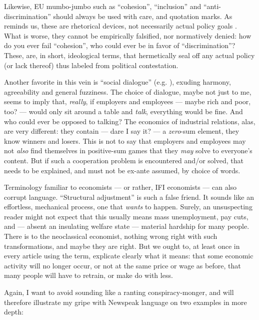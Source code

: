 \documentclass[11pt,a4paper,oneside,openright]{article}
\begin{document}
Likewise, \gls{EU} mumbo-jumbo such as ``cohesion'', ``inclusion'' and ``anti-discrimination'' should always be used with care, and quotation marks. 
As \citeauthor{Offe2003} reminds us, these are rhetorical devices, not necessarily actual policy goals \citeyearpar[461]{Offe2003}. 
What is worse, they cannot be empirically falsified, nor normatively denied: 
how do you ever fail ``cohesion'', who could ever be in favor of ``discrimination''? 
These, are, in short, ideological terms, that hermetically seal off any actual policy (or lack thereof) thus labeled from political contestation.

Another favorite in this vein is ``social dialogue'' (e.g. \citealt{Durr2009}), exuding harmony, agreeability and general fuzziness. 
The choice of dialogue, maybe not just to me, seems to imply that, \emph{really}, if employers and employees --- maybe rich and poor, too? --- would only sit around a table and \emph{talk}, everything would be fine. 
And who could ever be opposed to talking? 
The economics of industrial relations, alas, are very different: 
they contain --- dare I say it? --- a \emph{zero}-sum element, they know winners and losers. 
This is not to say that employers and employees may not \emph{also} find themselves in positive-sum games that they \emph{may} solve to everyone's content. 
But if such a cooperation problem is encountered and/or solved, that needs to be explained, and must not be ex-ante assumed, by choice of words.

Terminology familiar to economists --- or rather, \gls{IFI} economists --- can also corrupt language. 
``Structural adjustment'' \citep[e.g.][19]{Begg2008} is such a false friend. 
It sounds like an effortless, mechanical process, one that \emph{wants} to happen. 
Surely, an unsuspecting reader might not expect that this usually means mass unemployment, pay cuts, and --- absent an insulating welfare state --- material hardship for many people. 
There is to the neoclassical economist, nothing wrong right with such transformations, and maybe they are right. 
But we ought to, at least once in every article using the term, explicate clearly what it means: 
that some economic activity will no longer occur, or not at the same price or wage as before, that many people will have to retrain, or make do with less.

Again, I want to avoid sounding like a ranting conspiracy-monger, and will therefore illustrate my gripe with Newspeak language on two examples in more depth:
\end{document}
